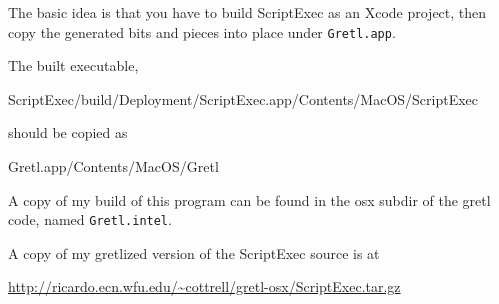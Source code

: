 \documentclass{article}
\begin{document}
The basic idea is that you have to build ScriptExec as an
Xcode project, then copy the generated bits and pieces into place
under \texttt{Gretl.app}.

The built executable,

\begin{code}
ScriptExec/build/Deployment/ScriptExec.app/Contents/MacOS/ScriptExec
\end{code}

should be copied as

\begin{code}
Gretl.app/Contents/MacOS/Gretl
\end{code}

A copy of my build of this program can be found in the osx subdir of
the gretl code, named \texttt{Gretl.intel}.

A copy of my gretlized version of the ScriptExec source is at

\url{http://ricardo.ecn.wfu.edu/~cottrell/gretl-osx/ScriptExec.tar.gz}
\end{document}
